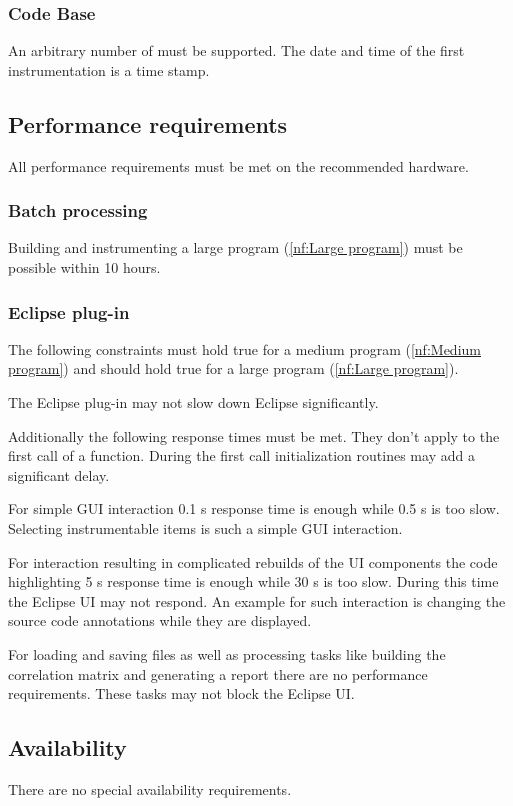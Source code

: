 \subsubsection{Code Base}
An arbitrary number of  must be supported. The date and time of the first instrumentation is a time stamp.

\subsection{Performance requirements} \label{nf:Performance requirements}
All performance requirements must be met on the recommended hardware.

\subsubsection{Batch processing}
Building and instrumenting a large program (\ref{nf:Large program}) must be possible within 10 hours.

\subsubsection{Eclipse plug-in}
The following constraints must hold true for a medium program (\ref{nf:Medium program}) and should hold true for a large program (\ref{nf:Large program}).
\par
The Eclipse plug-in may not slow down Eclipse significantly.
\par
Additionally the following response times must be met. They don't apply to the first call of a function. During the first call initialization routines may add a significant delay.
\par
For simple GUI interaction 0.1 s response time is enough while 0.5 s is too slow. Selecting instrumentable items is such a simple GUI interaction.
\par
For interaction resulting in complicated rebuilds of the UI components the code highlighting 5 s response time is enough while 30 s is too slow. During this time the Eclipse UI may not respond. An example for such interaction is changing the source code annotations while they are displayed.
\par
For loading and saving files as well as processing tasks like building the correlation matrix and generating a report there are no performance requirements. These tasks may not block the Eclipse UI.

\subsection{Availability}
There are no special availability requirements.

